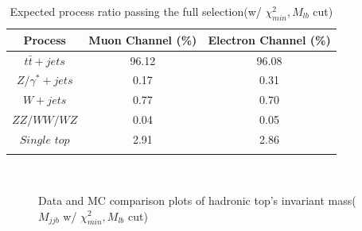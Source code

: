 		\begin{center}
		\begin{longtable}[H]{ c c c }
		\caption{Expected process ratio passing the full selection(w/ $\chi^2_{min}, M_{lb}$ cut)}\\
		\hline
		 Process & Muon Channel (\%) & Electron Channel (\%) \\ 
		\hline
		 $t\bar{t}+jets$ & 96.12 & 96.08 \\
		 $Z/\gamma^{*}+jets$ & 0.17 &  0.31 \\
		 $W+jets$ & 0.77 & 0.70 \\
		 $ZZ/WW/WZ$ & 0.04 & 0.05 \\
		 $Single$ $top$ & 2.91 & 2.86 \\
		\hline
		\label{EventSelReco:tb:MC_process_chi2}
		\end{longtable}
		\end{center}
		\FloatBarrier

		\begin{figure}[H]
		\centering
			\\
		\caption{Data and MC comparison plots of hadronic top's invariant mass($M_{jjb}$ w/ $\chi^2_{min}, M_{lb}$ cut)}
		\label{EventSelReco:fig:chi2_SR_2C_Mjjb}
		\end{figure}
		\FloatBarrier

